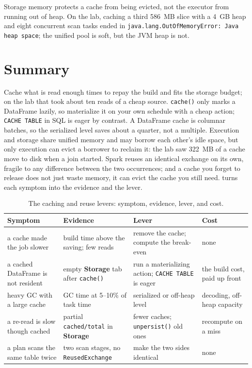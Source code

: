 \begin{note}
Storage memory protects a cache from being evicted, not the executor from running
out of heap. On the lab, caching a third 586~MB slice with a 4~GB heap and eight
concurrent scan tasks ended in \texttt{java.lang.OutOfMemoryError: Java heap
space}; the unified pool is soft, but the JVM heap is not.
\end{note}

\section{Summary}
\label{sec:caching-summary}

Cache what is read enough times to repay the build and fits the storage budget;
on the lab that took about ten reads of a cheap source. \texttt{cache()} only
marks a DataFrame lazily, so materialize it on your own schedule with a cheap
action; \texttt{CACHE TABLE} in SQL is eager by contrast. A DataFrame cache is
columnar batches, so the serialized level saves about a quarter, not a multiple.
Execution and storage share unified memory and may borrow each other's idle
space, but only execution can evict a borrower to reclaim it: the lab saw 322~MB
of a cache move to disk when a join started. Spark reuses an identical exchange
on its own, fragile to any difference between the two occurrences; and a cache
you forget to release does not just waste memory, it can evict the cache you
still need.  turns each symptom into the evidence and
the lever.

\begin{table}[htbp]
\centering\footnotesize
\renewcommand{\arraystretch}{1.25}
\begin{tabular}{@{}P{3.3cm}P{3.9cm}P{3.7cm}P{3.1cm}@{}}
\toprule
\textbf{Symptom} & \textbf{Evidence} & \textbf{Lever} & \textbf{Cost} \\
\midrule
a cache made the job slower & build time above the saving; few reads & remove the cache; compute the break-even & none \\
a cached DataFrame is not resident & empty \textbf{Storage} tab after \texttt{cache()} & run a materializing action; \texttt{CACHE TABLE} is eager & the build cost, paid up front \\
heavy GC with a large cache & GC time at 5--10\% of task time & serialized or off-heap level & decoding, off-heap capacity \\
a re-read is slow though cached & partial \texttt{cached/total} in \textbf{Storage} & fewer caches; \texttt{unpersist()} old ones & recompute on a miss \\
a plan scans the same table twice & two scan stages, no \texttt{ReusedExchange} & make the two sides identical & none \\
\bottomrule
\end{tabular}
\caption{The caching and reuse levers: symptom, evidence, lever, and cost.}
\label{tab:caching-levers}
\end{table}

